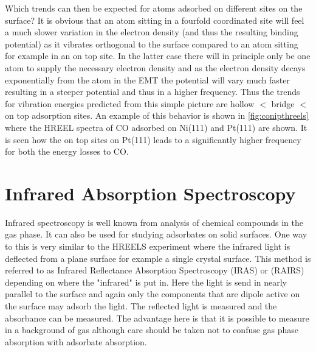 Which trends can then be expected for atoms adsorbed on different sites on the surface? It is obvious that an atom sitting in a fourfold coordinated site will feel a much slower variation in the electron density (and thus the resulting binding potential) as it vibrates orthogonal to the surface compared to an atom sitting for example in an  on top site. In the  latter case there will in principle  only be  one atom to supply the necessary electron density and as the electron density decays exponentially from the atom in the EMT the potential will vary much faster resulting in a steeper potential and thus in a higher frequency.  Thus the trends for vibration energies  predicted from this simple picture are hollow $<$ bridge $<$ on top adsorption sites.
An example of this behavior is shown in \autoref{fig:conipthreels} where the HREEL spectra of CO adsorbed on Ni(111) and Pt(111) are shown.  It is seen how the on top sites on Pt(111) leads to a significantly higher frequency for both the energy losses to CO.

\section{Infrared Absorption Spectroscopy}
Infrared spectroscopy is well known from analysis of chemical compounds in the gas phase. It can also be used for studying adsorbates on solid surfaces. One way to this is very similar to the HREELS experiment where the infrared light is deflected from a plane surface for example a single crystal surface.  This method is referred to as Infrared Reflectance Absorption Spectroscopy (IRAS) or (RAIRS) depending on where the "infrared" is put in. Here the light is send in nearly parallel to the surface and again only the components that are dipole active on the surface may adsorb the light. The reflected light is measured and the absorbance can be measured. The advantage here is that it is possible to measure in a background of gas although care should be taken not to confuse gas phase absorption  with adsorbate absorption. 

